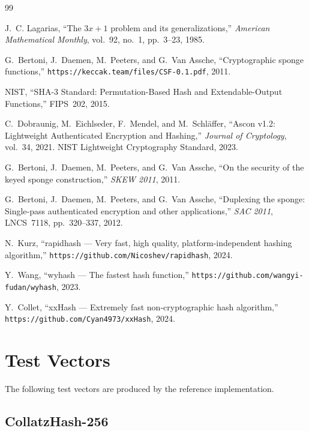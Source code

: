 \documentclass[11pt,a4paper]{article}
\begin{document}
\begin{thebibliography}{99}

J.~C. Lagarias,
``The $3x+1$ problem and its generalizations,''
\textit{American Mathematical Monthly}, vol.~92, no.~1, pp.~3--23, 1985.

G.~Bertoni, J.~Daemen, M.~Peeters, and G.~Van Assche,
``Cryptographic sponge functions,''
\texttt{https://keccak.team/files/CSF-0.1.pdf}, 2011.

NIST,
``SHA-3 Standard: Permutation-Based Hash and Extendable-Output
Functions,'' FIPS~202, 2015.

C.~Dobraunig, M.~Eichlseder, F.~Mendel, and M.~Schl\"affer,
``Ascon v1.2: Lightweight Authenticated Encryption and Hashing,''
\textit{Journal of Cryptology}, vol.~34, 2021.
NIST Lightweight Cryptography Standard, 2023.

G.~Bertoni, J.~Daemen, M.~Peeters, and G.~Van Assche,
``On the security of the keyed sponge construction,''
\textit{SKEW 2011}, 2011.

G.~Bertoni, J.~Daemen, M.~Peeters, and G.~Van Assche,
``Duplexing the sponge: Single-pass authenticated encryption and other
applications,'' \textit{SAC 2011}, LNCS~7118, pp.~320--337, 2012.

N.~Kurz,
``rapidhash --- Very fast, high quality, platform-independent hashing
algorithm,'' \texttt{https://github.com/Nicoshev/rapidhash}, 2024.

Y.~Wang,
``wyhash --- The fastest hash function,''
\texttt{https://github.com/wangyi-fudan/wyhash}, 2023.

Y.~Collet,
``xxHash --- Extremely fast non-cryptographic hash algorithm,''
\texttt{https://github.com/Cyan4973/xxHash}, 2024.

\end{thebibliography}

\appendix
\section{Test Vectors}
\label{app:testvectors}

The following test vectors are produced by the reference implementation.

\subsection{CollatzHash-256}
\end{document}
